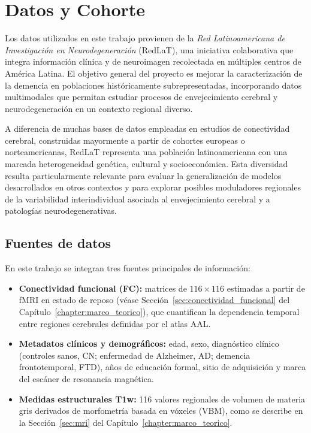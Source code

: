 \chapter{Datos y Cohorte}
\label{chapter:datos_cohorte}

Los datos utilizados en este trabajo provienen de la \textit{Red Latinoamericana de Investigación en Neurodegeneración} (RedLaT), una iniciativa colaborativa que integra información clínica y de neuroimagen recolectada en múltiples centros de América Latina. El objetivo general del proyecto es mejorar la caracterización de la demencia en poblaciones históricamente subrepresentadas, incorporando datos multimodales que permitan estudiar procesos de envejecimiento cerebral y neurodegeneración en un contexto regional diverso.

A diferencia de muchas bases de datos empleadas en estudios de conectividad cerebral, construidas mayormente a partir de cohortes europeas o norteamericanas, RedLaT representa una población latinoamericana con una marcada heterogeneidad genética, cultural y socioeconómica. Esta diversidad resulta particularmente relevante para evaluar la generalización de modelos desarrollados en otros contextos y para explorar posibles moduladores regionales de la variabilidad interindividual asociada al envejecimiento cerebral y a patologías neurodegenerativas.

\section{Fuentes de datos}
\label{sec:fuentes_datos}

En este trabajo se integran tres fuentes principales de información:
\begin{itemize}
    \item \textbf{Conectividad funcional (FC):} matrices de $116 \times 116$ estimadas a partir de fMRI en estado de reposo (véase Sección~\ref{sec:conectividad_funcional} del Capítulo~\ref{chapter:marco_teorico}), que cuantifican la dependencia temporal entre regiones cerebrales definidas por el atlas AAL.
    \item \textbf{Metadatos clínicos y demográficos:} edad, sexo, diagnóstico clínico (controles sanos, CN; enfermedad de Alzheimer, AD; demencia frontotemporal, FTD), años de educación formal, sitio de adquisición y marca del escáner de resonancia magnética.
    \item \textbf{Medidas estructurales T1w:} 116 valores regionales de volumen de materia gris derivados de morfometría basada en vóxeles (VBM), como se describe en la Sección~\ref{sec:mri} del Capítulo~\ref{chapter:marco_teorico}.
\end{itemize}

